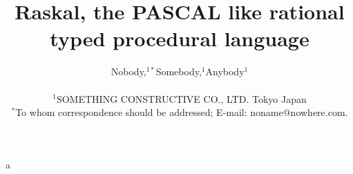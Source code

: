 \documentclass[12pt]{article}
\title{Raskal, the PASCAL like rational typed procedural language}
\author
{Nobody,$^{1\ast}$Somebody,$^{1}$Anybody$^{1}$\\
\\
\normalsize{$^{1}$SOMETHING CONSTRUCTIVE  CO., LTD. Tokyo Japan}\\
\normalsize{$^\ast$To whom correspondence should be addressed;
  E-mail: noname@nowhere.com.}
}
\date{}
\begin{document}
\maketitle
a
\end{document}
